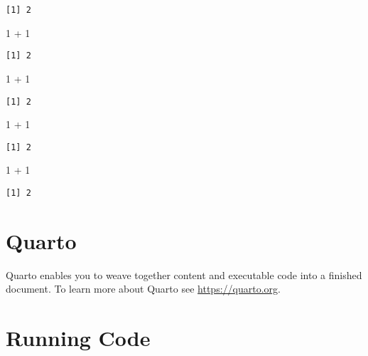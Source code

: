 \documentclass[
  a4paper,
  DIV=11,
  numbers=noendperiod]{scrartcl}
\newenvironment{Shaded}{\begin{snugshade}}{\end{snugshade}}
\newcommand{\DecValTok}[1]{\textcolor[rgb]{0.68,0.00,0.00}{#1}}
\newcommand{\SpecialCharTok}[1]{\textcolor[rgb]{0.37,0.37,0.37}{#1}}
\begin{document}
\begin{verbatim}
[1] 2
\end{verbatim}

\begin{Shaded}
\begin{Highlighting}[]
\DecValTok{1} \SpecialCharTok{+} \DecValTok{1}
\end{Highlighting}
\end{Shaded}

\begin{verbatim}
[1] 2
\end{verbatim}

\begin{Shaded}
\begin{Highlighting}[]
\DecValTok{1} \SpecialCharTok{+} \DecValTok{1}
\end{Highlighting}
\end{Shaded}

\begin{verbatim}
[1] 2
\end{verbatim}

\begin{Shaded}
\begin{Highlighting}[]
\DecValTok{1} \SpecialCharTok{+} \DecValTok{1}
\end{Highlighting}
\end{Shaded}

\begin{verbatim}
[1] 2
\end{verbatim}

\begin{Shaded}
\begin{Highlighting}[]
\DecValTok{1} \SpecialCharTok{+} \DecValTok{1}
\end{Highlighting}
\end{Shaded}

\begin{verbatim}
[1] 2
\end{verbatim}

\hypertarget{quarto}{%
\section{Quarto}\label{quarto}}

Quarto enables you to weave together content and executable code into a
finished document. To learn more about Quarto see
\url{https://quarto.org}.

\hypertarget{running-code}{%
\section{Running Code}\label{running-code}}
\end{document}
